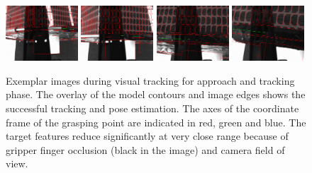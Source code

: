 %
\begin{figure}
\centering\includegraphics[angle=0,width=0.24\textwidth]{./figures/frame0786_result_cam0}
\centering\includegraphics[angle=0,width=0.24\textwidth]{./figures/frame0849_result_cam0}
\centering\includegraphics[angle=0,width=0.24\textwidth]{./figures/frame0922_result_cam0}
\centering\includegraphics[angle=0,width=0.24\textwidth]{./figures/frame0954_result_cam0}
\caption{Exemplar images during visual tracking for approach and tracking phase. The overlay of the model contours  and image edges shows the successful tracking and pose estimation. The axes of the coordinate frame of the grasping point are indicated in red, green and blue. The target features reduce significantly at very close range because of gripper finger occlusion (black in the image) and camera field of view.}
\label{fig:TrackingImages}
\end{figure}



